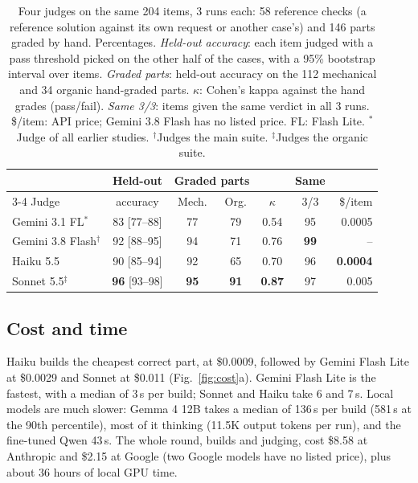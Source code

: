 \begin{table}[t]
  \centering
  \small
  \setlength{\tabcolsep}{2.4pt}
  \begin{tabular}{@{}lccccc r@{}}
    \toprule
    & Held-out & \multicolumn{2}{c}{Graded parts} & & Same & \\
    \cmidrule(lr){3-4}
    Judge & accuracy & Mech. & Org. & $\kappa$ & 3/3 & \$/item \\
    \midrule
    Gemini 3.1 FL$^{*}$ & 83 [77--88] & 77 & 79 & 0.54 & 95 & 0.0005 \\
    Gemini 3.8 Flash$^{\dagger}$ & 92 [88--95] & 94 & 71 & 0.76 & \textbf{99} & -- \\
    Haiku 5.5 & 90 [85--94] & 92 & 65 & 0.70 & 96 & \textbf{0.0004} \\
    Sonnet 5.5$^{\ddagger}$ & \textbf{96} [93--98] & \textbf{95} & \textbf{91} & \textbf{0.87} & 97 & 0.005 \\
    \bottomrule
  \end{tabular}
  \caption{Four judges on the same 204 items, 3 runs each: 58 reference checks (a reference solution against its
    own request or another case's) and 146 parts graded by hand. Percentages. \emph{Held-out accuracy}: each item
    judged with a pass threshold picked on the other half of the cases, with a 95\% bootstrap interval over items.
    \emph{Graded parts}: held-out accuracy on the 112 mechanical and 34 organic hand-graded parts. $\kappa$: Cohen's
    kappa against the hand grades (pass/fail). \emph{Same 3/3}: items given the same verdict in all 3 runs.
    \$/item: API price; Gemini 3.8 Flash has no listed price. FL: Flash Lite. $^{*}$Judge of all earlier studies.
    $^{\dagger}$Judges the main suite. $^{\ddagger}$Judges the organic suite.}
  \label{tab:judges}
\end{table}

\subsection{Cost and time}
\label{sec:res-cost}
Haiku builds the cheapest correct part, at \$0.0009, followed by Gemini Flash Lite at \$0.0029 and Sonnet at \$0.011 (Fig.~\ref{fig:cost}a).
Gemini Flash Lite is the fastest, with a median of 3\,s per build; Sonnet and Haiku take 6 and 7\,s.
Local models are much slower: Gemma 4 12B takes a median of 136\,s per build (581\,s at the 90th percentile), most of it thinking (11.5K output tokens per run), and the fine-tuned Qwen 43\,s.
The whole round, builds and judging, cost \$8.58 at Anthropic and \$2.15 at Google (two Google models have no listed price), plus about 36 hours of local GPU time.

